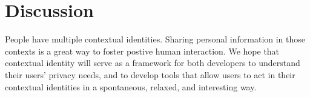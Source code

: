 \documentclass{llncs}
\begin{document}
\section{Discussion}
People have multiple contextual identities. Sharing personal information in
those contexts is a great way to foster postive human interaction.  We hope
that contextual identity will serve as a framework for both developers to
understand their users' privacy needs, and to develop tools that allow users to
act in their contextual identities in a spontaneous, relaxed, and interesting
way.

\begin{comment}
papers:
expectation of privacy\cite{viegas}
http://jcmc.indiana.edu/vol10/issue3/viegas.html

danah boyd
making sense of privacy and publicity: whose voice counts? does your child's
teacher have a right to be public in her other roles online? does she have a
right to be secular? religious? friend? lover? if you work for company X and
you disagree with their policies, are you allowed to be public about
that:?\cite{boyd2}

close to you “stranger on a train” “stranger on a plane”
\end{comment}

\begin{comment}
\section{Acknowledgements}
The authors thank
Lucas Adamski
Ben Adida
Mike Connor
Ed Lee
\end{comment}



\end{document}
